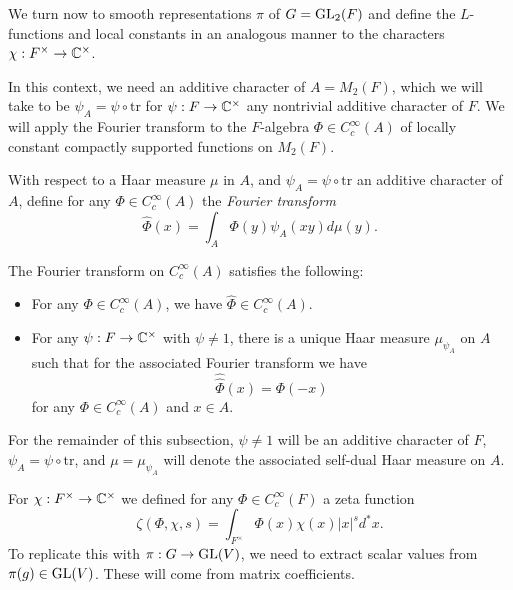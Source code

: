 We turn now to smooth representations $\pi$ of $G=\mathrm{GL}_2(F)$ and define the $L$-functions and local constants in an analogous manner to the characters $\chi :F^\times \to \mathbb{C}^\times$.

In this context, we need an additive character of $A=M_2(F)$, which we will take to be $\psi_A = \psi \circ \mathrm{tr}$ for $\psi : F \to \mathbb{C}^\times$ any nontrivial additive character of $F$. We will apply the Fourier transform to the $F$-algebra $\Phi \in C_c^\infty(A)$ of locally constant compactly supported functions on $M_2(F)$.

\begin{defn}
    With respect to a Haar measure $\mu$ in $A$, and $\psi_A=\psi \circ \mathrm{tr}$ an additive character of $A$, define for any $\Phi \in C_c^\infty(A)$ the \textit{Fourier transform}
    $$\hat{\Phi}(x) = \int_A\Phi(y) \psi_A(xy)d\mu(y).$$
\end{defn}

\begin{prop}
    The Fourier transform on $C_c^\infty(A)$ satisfies the following:    
    
    \begin{itemize}

        \item For any $\Phi \in C_c^\infty(A)$, we have $\hat{\Phi} \in C_c^\infty(A)$.
        \item For any $\psi: F \to \mathbb{C}^\times$ with $\psi \neq 1$, there is a unique Haar measure $\mu_{\psi_A}$ on $A$ such that for the associated Fourier transform we have $$\hat{\hat{\Phi}}(x) = \Phi(-x)$$ for any $\Phi \in C_c^\infty(A)$ and $x \in A$.
    \end{itemize}
    
\end{prop}

\begin{notn}
    For the remainder of this subsection, $\psi \neq 1$ will be an additive character of $F$, $\psi_A = \psi \circ \mathrm{tr}$, and $\mu= \mu_{\psi_A}$ will denote the associated self-dual Haar measure on $A$.
\end{notn}

For $\chi:F^\times \to \mathbb{C}^\times$ we defined for any $\Phi \in C_c^\infty(F)$ a zeta function $$\zeta(\Phi,\chi,s) = \int_{F^\times} \Phi(x)\chi(x) |x|^s d^*x.$$
To replicate this with $\pi : G \to \mathrm{GL}(V)$, we need to extract scalar values from $\pi(g) \in \mathrm{GL}(V)$. These will come from matrix coefficients.

